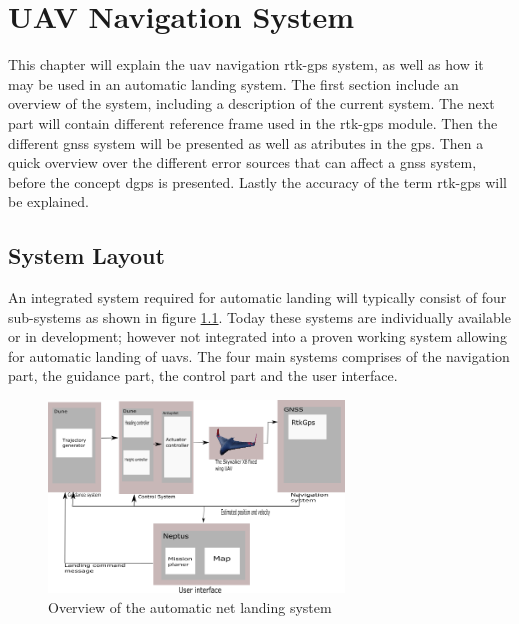 
\chapter{UAV Navigation System}
This chapter will explain the \gls{uav} navigation \acrfull{rtk-gps} system, as well as how it may be used in an automatic landing system. The first section include an overview of the system, including a description of the current system. The next part will contain different reference frame used in the \gls{rtk-gps} module. Then the different \acrfull{gnss} system will be presented as well as atributes in the \acrfull{gps}. Then a quick overview over the different error sources that can affect a \gls{gnss} system, before the concept \acrfull{dgps} is presented. Lastly the accuracy of the term \gls{rtk-gps} will be explained.

\section{System Layout}
An integrated system required for automatic landing will typically consist of four sub-systems as shown in figure \ref{figure:SystemOverview}. Today these systems are individually available or in development; however not integrated into a proven working system allowing for automatic landing of \glspl{uav}. The four main systems comprises of the navigation part, the guidance part, the control part and the user interface.

\begin{figure}[H]
	\centering
		\includegraphics[width=0.7\textwidth]{figs/SystemOverview.png}
		\caption{Overview of the automatic net landing system}
		\label{figure:SystemOverview}
\end{figure}

